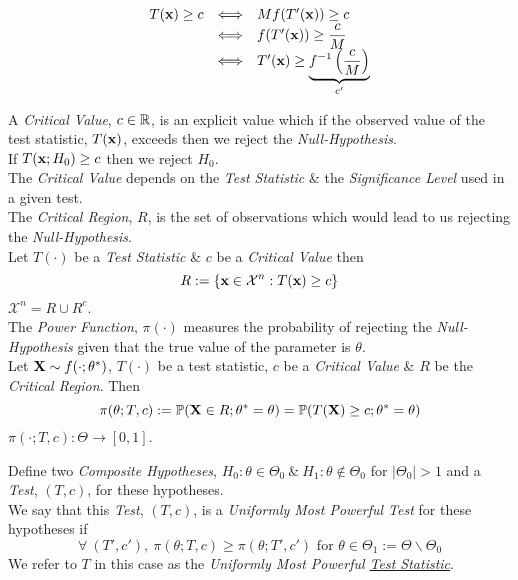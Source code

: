 \documentclass[11pt,a4paper]{article}
\begin{document}
\[\begin{array}{rcl}
T(\textbf{x})\geq c&\Longleftrightarrow&Mf(T'(\textbf{x}))\geq c\\
&\Longleftrightarrow&f(T'(\textbf{x}))\geq\dfrac{c}{M}\\
&\Longleftrightarrow&T'(\textbf{x})\geq\underbrace{f^{-1}\left(\dfrac{c}{M}\right)}_{c'}
\end{array}\]

A \textit{Critical Value}, $c\in\mathbb{R}$, is an explicit value which if the observed value of the test statistic, $T(\textbf{x})$, exceeds then we reject the \textit{Null-Hypothesis}.\\
\ie If $T(\textbf{x};H_0)\geq c$ then we reject $H_0$.\\
\nb The \textit{Critical Value} depends on the \textit{Test Statistic} \& the \textit{Significance Level} used in a given test.\\

The \textit{Critical Region}, $R$, is the set of observations which would lead to us rejecting the \textit{Null-Hypothesis}.\\
Let $T(\cdot)$ be a \textit{Test Statistic} \& $c$ be a \textit{Critical Value} then
$$R:=\{\textbf{x}\in\mathcal{X}^n:T(\textbf{x})\geq c\}$$
\nb $\mathcal{X}^n=R\cup R^c$.\\

The \textit{Power Function}, $\pi(\cdot)$ measures the probability of rejecting the \textit{Null-Hypothesis} given that the true value of the parameter is $\theta$.\\
Let $\textbf{X}\sim f(\cdot;\theta^*)$, $T(\cdot)$ be a test statistic, $c$ be a \textit{Critical Value} \& $R$ be the \textit{Critical Region}. Then
$$\pi(\theta;T,c):=\mathbb{P}(\textbf{X}\in R;\theta^*=\theta)=\mathbb{P}(T(\textbf{X})\geq c;\theta^*=\theta)$$
\nb $\pi(\cdot;T,c):\Theta\to[0,1]$.\\


Define two \textit{Composite Hypotheses}, $H_0:\theta\in\Theta_0\ \&\ H_1:\theta\not\in\Theta_0$ for $|\Theta_0|>1$ and a \textit{Test}, $(T,c)$, for these hypotheses.\\
We say that this \textit{Test}, $(T,c)$, is a \textit{Uniformly Most Powerful Test} for these hypotheses if
$$\forall\ (T',c'),\ \pi(\theta;T,c)\geq\pi(\theta;T',c')\text{ for }\theta\in\Theta_1:=\Theta\backslash\Theta_0$$
\nb We refer to $T$ in this case as the \textit{Uniformly Most Powerful \underline{Test Statistic}}.\\
\end{document}
